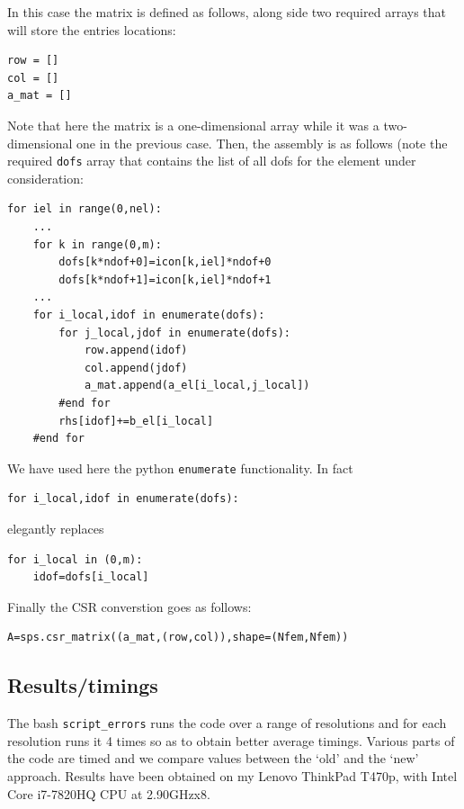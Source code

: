 In this case the matrix is defined as follows, along side two 
required arrays that will store the entries locations:
\begin{lstlisting}
row = [] 
col = []
a_mat = []
\end{lstlisting}
Note that here the matrix is a one-dimensional array
while it was a two-dimensional one in the previous case.
Then, the assembly is as follows (note the required \lstinline{dofs}
array that contains the list of all dofs for the element under consideration:
\begin{lstlisting}
for iel in range(0,nel):
    ...
    for k in range(0,m):
        dofs[k*ndof+0]=icon[k,iel]*ndof+0
        dofs[k*ndof+1]=icon[k,iel]*ndof+1
    ...
    for i_local,idof in enumerate(dofs):
        for j_local,jdof in enumerate(dofs):
            row.append(idof)
            col.append(jdof)
            a_mat.append(a_el[i_local,j_local])
        #end for
        rhs[idof]+=b_el[i_local]
    #end for
\end{lstlisting}
We have used here the python \lstinline{enumerate} functionality. In fact
\begin{lstlisting}
for i_local,idof in enumerate(dofs):
\end{lstlisting}
elegantly replaces
\begin{lstlisting}
for i_local in (0,m):
    idof=dofs[i_local]
\end{lstlisting}
Finally the CSR converstion goes as follows:
\begin{lstlisting}
A=sps.csr_matrix((a_mat,(row,col)),shape=(Nfem,Nfem))
\end{lstlisting}


\subsection*{Results/timings}

The bash {\tt script\_errors} runs the code over a range of resolutions 
and for each resolution runs it 4 times so as to obtain better average 
timings. 
Various parts of the code are timed and we compare values between the `old'
and the `new' approach.
Results have been obtained on my Lenovo ThinkPad T470p, with Intel Core i7-7820HQ CPU at 2.90GHzx8.

